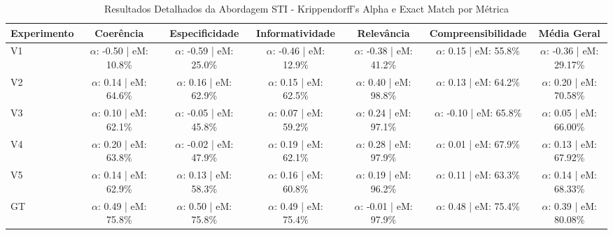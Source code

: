 \begin{table}[htbp]
\caption{Resultados Detalhados da Abordagem STI - Krippendorff's Alpha e Exact Match por Métrica}
\label{tab:sti_krippendorff}
\centering

\begin{adjustbox}{max width=\textwidth}
\begin{tabular}{lcccccc}
\toprule
Experimento & Coerência & Especificidade & Informatividade & Relevância & Compreensibilidade & Média Geral \\
\midrule
V1 & $\alpha$: -0.50 | eM: 10.8\% & $\alpha$: -0.59 | eM: 25.0\% & $\alpha$: -0.46 | eM: 12.9\% & $\alpha$: -0.38 | eM: 41.2\% & $\alpha$: 0.15 | eM: 55.8\% & $\alpha$: -0.36 | eM: 29.17\% \\
V2 & $\alpha$: 0.14 | eM: 64.6\% & $\alpha$: 0.16 | eM: 62.9\% & $\alpha$: 0.15 | eM: 62.5\% & $\alpha$: 0.40 | eM: 98.8\% & $\alpha$: 0.13 | eM: 64.2\% & $\alpha$: 0.20 | eM: 70.58\% \\
V3 & $\alpha$: 0.10 | eM: 62.1\% & $\alpha$: -0.05 | eM: 45.8\% & $\alpha$: 0.07 | eM: 59.2\% & $\alpha$: 0.24 | eM: 97.1\% & $\alpha$: -0.10 | eM: 65.8\% & $\alpha$: 0.05 | eM: 66.00\% \\
V4 & $\alpha$: 0.20 | eM: 63.8\% & $\alpha$: -0.02 | eM: 47.9\% & $\alpha$: 0.19 | eM: 62.1\% & $\alpha$: 0.28 | eM: 97.9\% & $\alpha$: 0.01 | eM: 67.9\% & $\alpha$: 0.13 | eM: 67.92\% \\
V5 & $\alpha$: 0.14 | eM: 62.9\% & $\alpha$: 0.13 | eM: 58.3\% & $\alpha$: 0.16 | eM: 60.8\% & $\alpha$: 0.19 | eM: 96.2\% & $\alpha$: 0.11 | eM: 63.3\% & $\alpha$: 0.14 | eM: 68.33\% \\
GT & $\alpha$: 0.49 | eM: 75.8\% & $\alpha$: 0.50 | eM: 75.8\% & $\alpha$: 0.49 | eM: 75.4\% & $\alpha$: -0.01 | eM: 97.9\% & $\alpha$: 0.48 | eM: 75.4\% & $\alpha$: 0.39 | eM: 80.08\% \\
\bottomrule
\end{tabular}
\end{adjustbox}

\end{table}